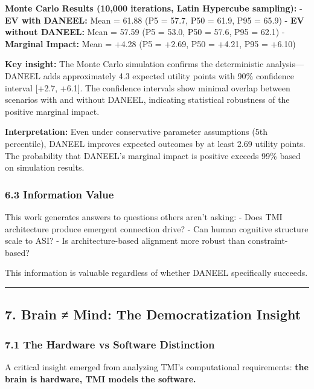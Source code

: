 \documentclass[
  11pt,
]{article}
\begin{document}
\textbf{Monte Carlo Results (10,000 iterations, Latin Hypercube
sampling):} - \textbf{EV with DANEEL:} Mean = 61.88 (P5 = 57.7, P50 =
61.9, P95 = 65.9) - \textbf{EV without DANEEL:} Mean = 57.59 (P5 = 53.0,
P50 = 57.6, P95 = 62.1) - \textbf{Marginal Impact:} Mean = +4.28 (P5 =
+2.69, P50 = +4.21, P95 = +6.10)

\textbf{Key insight:} The Monte Carlo simulation confirms the
deterministic analysis---DANEEL adds approximately 4.3 expected utility
points with 90\% confidence interval {[}+2.7, +6.1{]}. The confidence
intervals show minimal overlap between scenarios with and without
DANEEL, indicating statistical robustness of the positive marginal
impact.

\textbf{Interpretation:} Even under conservative parameter assumptions
(5th percentile), DANEEL improves expected outcomes by at least 2.69
utility points. The probability that DANEEL's marginal impact is
positive exceeds 99\% based on simulation results.

\subsubsection{6.3 Information Value}\label{information-value}

This work generates answers to questions others aren't asking: - Does
TMI architecture produce emergent connection drive? - Can human
cognitive structure scale to ASI? - Is architecture-based alignment more
robust than constraint-based?

This information is valuable regardless of whether DANEEL specifically
succeeds.

\begin{center}\rule{0.5\linewidth}{0.5pt}\end{center}

\subsection{7. Brain ≠ Mind: The Democratization
Insight}\label{brain-mind-the-democratization-insight}

\subsubsection{7.1 The Hardware vs Software
Distinction}\label{the-hardware-vs-software-distinction}

A critical insight emerged from analyzing TMI's computational
requirements: \textbf{the brain is hardware, TMI models the software.}
\end{document}
